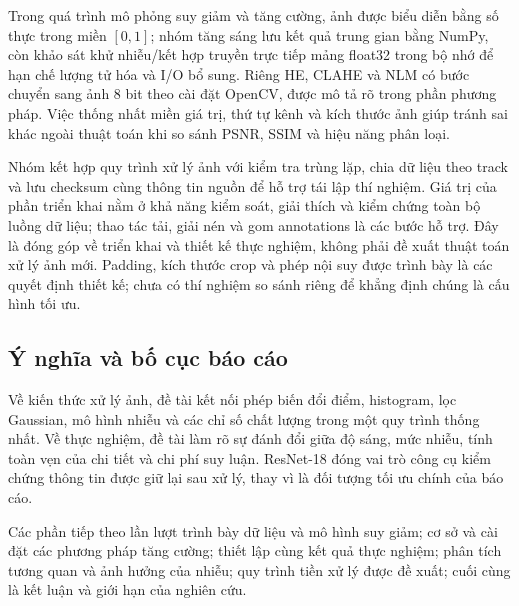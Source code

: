 Trong quá trình mô phỏng suy giảm và tăng cường, ảnh được biểu diễn bằng số thực trong miền $[0,1]$; nhóm tăng sáng lưu kết quả trung gian bằng NumPy, còn khảo sát khử nhiễu/kết hợp truyền trực tiếp mảng float32 trong bộ nhớ để hạn chế lượng tử hóa và I/O bổ sung. Riêng HE, CLAHE và NLM có bước chuyển sang ảnh 8 bit theo cài đặt OpenCV, được mô tả rõ trong phần phương pháp. Việc thống nhất miền giá trị, thứ tự kênh và kích thước ảnh giúp tránh sai khác ngoài thuật toán khi so sánh PSNR, SSIM và hiệu năng phân loại.

Nhóm kết hợp quy trình xử lý ảnh với kiểm tra trùng lặp, chia dữ liệu theo track và lưu checksum cùng thông tin nguồn để hỗ trợ tái lập thí nghiệm. Giá trị của phần triển khai nằm ở khả năng kiểm soát, giải thích và kiểm chứng toàn bộ luồng dữ liệu; thao tác tải, giải nén và gom annotations là các bước hỗ trợ. Đây là đóng góp về triển khai và thiết kế thực nghiệm, không phải đề xuất thuật toán xử lý ảnh mới. Padding, kích thước crop và phép nội suy được trình bày là các quyết định thiết kế; chưa có thí nghiệm so sánh riêng để khẳng định chúng là cấu hình tối ưu.

\subsection{Ý nghĩa và bố cục báo cáo}
Về kiến thức xử lý ảnh, đề tài kết nối phép biến đổi điểm, histogram, lọc Gaussian, mô hình nhiễu và các chỉ số chất lượng trong một quy trình thống nhất. Về thực nghiệm, đề tài làm rõ sự đánh đổi giữa độ sáng, mức nhiễu, tính toàn vẹn của chi tiết và chi phí suy luận. ResNet-18 đóng vai trò công cụ kiểm chứng thông tin được giữ lại sau xử lý, thay vì là đối tượng tối ưu chính của báo cáo.

Các phần tiếp theo lần lượt trình bày dữ liệu và mô hình suy giảm; cơ sở và cài đặt các phương pháp tăng cường; thiết lập cùng kết quả thực nghiệm; phân tích tương quan và ảnh hưởng của nhiễu; quy trình tiền xử lý được đề xuất; cuối cùng là kết luận và giới hạn của nghiên cứu.
